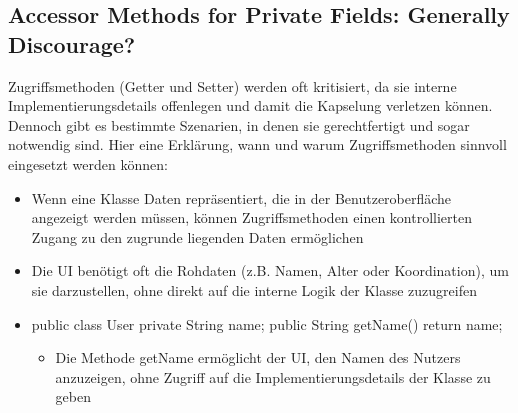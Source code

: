 \subsection{Accessor Methods for Private Fields: Generally Discourage?}
\begin{infoBox}
    Zugriffsmethoden (Getter und Setter) werden oft kritisiert, da sie interne Implementierungsdetails offenlegen und damit die Kapselung verletzen können. Dennoch gibt es bestimmte Szenarien, in denen sie gerechtfertigt und sogar notwendig sind. Hier eine Erklärung, wann und warum Zugriffsmethoden sinnvoll eingesetzt werden können:
\end{infoBox}
\begin{infoBox}[title=Notwendig für die Benutzeroberfläche (UI)]
    \begin{itemize}
        \item {} Wenn eine Klasse Daten repräsentiert, die in der Benutzeroberfläche angezeigt werden müssen, können Zugriffsmethoden einen kontrollierten Zugang zu den zugrunde liegenden Daten ermöglichen
        \item {} Die UI benötigt oft die Rohdaten (z.B. Namen, Alter oder Koordination), um sie darzustellen, ohne direkt auf die interne Logik der Klasse zuzugreifen
        \item {}
        \begin{codeBlock}{}
            public class User{
                private String name;
                public String getName(){
                    return name;
                }
            }
        \end{codeBlock}
        \begin{itemize}
            \item Die Methode getName ermöglicht der UI, den Namen des Nutzers anzuzeigen, ohne Zugriff auf die Implementierungsdetails der Klasse zu geben
        \end{itemize}
    \end{itemize}
\end{infoBox}
